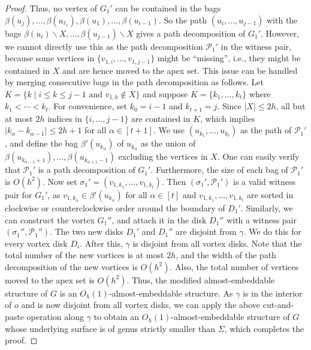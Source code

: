 \documentclass[a4paper,11pt]{article}
\numberwithin{lemma}{section}
\begin{document}
\begin{proof}
Thus, no vertex of $G_1'$ can be contained in the bags $\beta(u_j),\dots,\beta(u_{\ell_1}),\beta(u_1),\dots,\beta(u_{i-1})$.
So the path $(u_i,\dots,u_{j-1})$ with the bags $\beta(u_i) \backslash X,\dots,\beta(u_{j-1}) \backslash X$ gives a path decomposition of $G_1'$.
However, we cannot directly use this as the path decomposition $\mathcal{P}_1'$ in the witness pair, because some vertices in $\{v_{1,i},\dots,v_{1,j-1}\}$ might be ``missing'', i.e., they might be contained in $X$ and are hence moved to the apex set.
This issue can be handled by merging consecutive bags in the path decomposition as follows.
Let $K = \{k \mid i \leq k \leq j-1 \text{ and } v_{1,k} \notin X\}$ and suppose $K = \{k_1,\dots,k_t\}$ where $k_1 < \cdots < k_t$.
For convenience, set $k_0 = i-1$ and $k_{t+1} = j$.
Since $|X| \leq 2h$, all but at most $2h$ indices in $\{i,\dots,j-1\}$ are contained in $K$, which implies $|k_\alpha - k_{\alpha-1}| \leq 2h+1$ for all $\alpha \in [t+1]$.
We use $(u_{k_1},\dots,u_{k_t})$ as the path of $\mathcal{P}_1'$, and define the bag $\beta'(u_{k_\alpha})$ of $u_{k_\alpha}$ as the union of $\beta(u_{k_{\alpha-1}+1}),\dots,\beta(u_{k_{\alpha+1}-1})$ excluding the vertices in $X$.
One can easily verify that $\mathcal{P}_1'$ is a path decomposition of $G_1'$.
Furthermore, the size of each bag of $\mathcal{P}_1'$ is $O(h^2)$.
Now set $\sigma_1' = (v_{1,k_1},\dots,v_{1,k_t})$.
Then $(\sigma_1',\mathcal{P}_1')$ is a valid witness pair for $G_1'$, as $v_{1,k_\alpha} \in \beta'(u_{k_\alpha})$ for all $\alpha \in [t]$ and $v_{1,k_1},\dots,v_{1,k_t}$ are sorted in clockwise or counterclockwise order around the boundary of $D_1'$.
Similarly, we can construct the vortex $G_1''$, and attach it in the disk $D_1''$ with a witness pair $(\sigma_1'',\mathcal{P}_1'')$.
The two new disks $D_1'$ and $D_1''$ are disjoint from $\gamma$.
We do this for every vortex disk $D_i$.
After this, $\gamma$ is disjoint from all vortex disks.
Note that the total number of the new vortices is at most $2h$, and the width of the path decomposition of the new vortices is $O(h^2)$.
Also, the total number of vertices moved to the apex set is $O(h^2)$.
Thus, the modified almost-embeddable structure of $G$ is an $O_h(1)$-almost-embeddable structure.
As $\gamma$ is in the interior of $o$ and is now disjoint from all vortex disks, we can apply the above cut-and-paste operation along $\gamma$ to obtain an $O_h(1)$-almost-embeddable structure of $G$ whose underlying surface is of genus strictly smaller than $\varSigma$, which completes the proof.
\end{proof}
 
\end{document}
